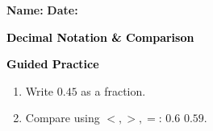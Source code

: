 \documentclass[12pt, letterpaper, fleqn]{article}
\newcommand{\blank}{\underline{\hspace{2.2cm}}}
\begin{document}
\textbf{Name:} \underline{\hspace{5cm}}
\hfill
\textbf{Date:} \underline{\hspace{3cm}}\\

\begin{tcolorbox}[colback=customteal!20]
    \large\textcolor{black}{\textbf{Decimal Notation & Comparison}}
\end{tcolorbox}
\newpage
\begin{tcolorbox}[colback=customteal!20]
    \large\textcolor{black}{\textbf{Guided Practice}}
\end{tcolorbox}
\begin{enumerate}[itemsep=3.5cm, leftmargin=0.6cm]
\item Write $0.45$ as a fraction.
\vspace{3cm}
\item Compare using $<, >, =$: $0.6$ \blank $0.59$.
\end{enumerate}
\end{document}
